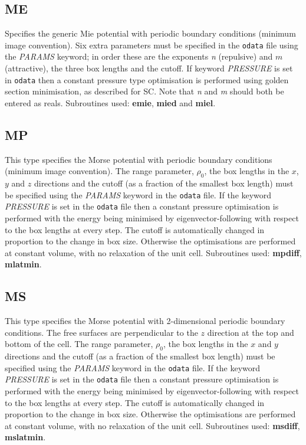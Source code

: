 \documentclass[12pt,a4paper,dvips]{article}
\begin{document}
\subsection{ME}Specifies the generic Mie potential with periodic boundary conditions (minimum
image convention). Six extra parameters must be specified in the {\tt odata} file using the
{\it PARAMS\/} keyword;
in order these are the exponents {\it n\/} (repulsive) and $m$ (attractive), the three box
lengths and the cutoff. If keyword {\it PRESSURE\/} is set in {\tt odata}
then a constant pressure type optimisation is performed
using golden section minimisation, as described for SC. Note that
{\it n\/} and {\it m\/} should both be entered as reals. Subroutines used: {\bf emie}, {\bf mied}
and {\bf miel}. 

\subsection{MP}This type specifies the Morse potential with 
periodic boundary conditions (minimum image convention\cite{allent87}). 
The range parameter, $\rho_0$, the box lengths in the $x$, $y$ and $z$ 
directions and the cutoff (as a fraction of the smallest box length)
must be specified using the {\it PARAMS\/} keyword in the {\tt odata} file.
If the keyword {\it PRESSURE\/} is set in the {\tt odata} file
then a constant pressure optimisation is performed
with the energy being minimised by eigenvector-following with respect to the 
box lengths at every step. 
The cutoff is automatically changed in proportion to the change in box size.
Otherwise the optimisations are performed at constant volume, with no 
relaxation of the unit cell. 
Subroutines used: {\bf mpdiff}, {\bf mlatmin}.

\subsection{MS}This type specifies the Morse potential with 2-dimensional
periodic boundary conditions.
The free surfaces are perpendicular to the $z$ direction at the top and bottom
of the cell.
The range parameter, $\rho_0$, the box lengths in the $x$ and $y$ 
directions and the cutoff (as a fraction of the smallest box length)
must be specified using the {\it PARAMS\/} keyword in the {\tt odata} file.
If the keyword {\it PRESSURE\/} is set in the {\tt odata} file
then a constant pressure optimisation is performed
with the energy being minimised by eigenvector-following with respect to the 
box lengths at every step. 
The cutoff is automatically changed in proportion to the change in box size.
Otherwise the optimisations are performed at constant volume, with no 
relaxation of the unit cell. 
Subroutines used: {\bf msdiff}, {\bf mslatmin}.
\end{document}
